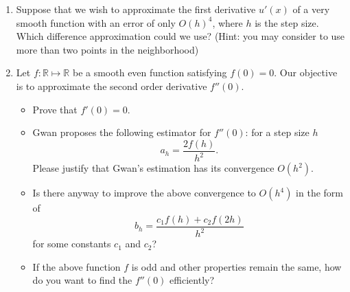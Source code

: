 \documentclass{article}
\begin{document}
\begin{enumerate}
 \item Suppose that we wish to approximate the first derivative $u'(x)$ of a very smooth function with an error of only $O(h)^4$, where $h$ is the step size. Which difference approximation could we use? (Hint: you may consider to use more than two points in the neighborhood)

 
 
 \item 
Let $f:\mathbb R\mapsto \mathbb R$ be a smooth even function 
satisfying $f(0) = 0$. 
Our objective is to approximate  the second order derivative $f''(0)$. 
\begin{itemize}
 \item Prove that $f'(0) = 0.$
 \item Gwan proposes the following estimator for $f''(0)$: for a step size $h$
 $$a_{h} = \frac{2f(h)}{h^{2}}.$$
 Please justify that Gwan's estimation has its convergence $O(h^{2})$.
 \item Is there anyway to improve the above 
 convergence to $O(h^{4})$ in the form of 
 $$b_{h} = \frac{c_{1} f(h) + c_{2}f(2h)}{h^{2}}$$
 for some constants $c_{1}$ and $c_{2}$?
 \item If the above function $f$ is odd and other properties remain the same, how do you want to find the $f''(0)$ efficiently?
\end{itemize}

\iffalse
{\bf Solution}
\begin{itemize}
 \item it can be directly shown from the definition of $f'$.
 \item $f^{n}(0) = 0$ for all odd number $n$. Therefore, 
 taylor expansion gives 
 $$f(h) = \frac 1 2 h^{2} f''(0) + \frac 1 {24} h^{4}f^{(4)}(0) + O(h^{6}),$$
 and the result follows.
 \item we can combine the above taylor expansion with
 $$f(2h) = 2h^{2} f''(0) + \frac 2 3 h^{4} f^{(4)}(0) + O(h^{6}).$$
 It yields that, with $c_{1} = 8/3$ and $c_{2} = - 1/6$, 
 $$c_{1} f(h) + c_{2}f(2h) = h^{2}f''(0) + O(h^{6}).$$
 \item 
 If $f$ is odd, then $f''(0) = 0$ and no estimate is needed any more.
\end{itemize}
\fi

\end{enumerate}
\end{document}
